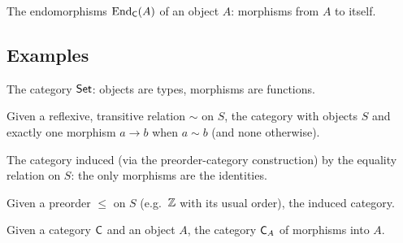 \begin{definition}[Endomorphism]
  \label{def:prelims:category-end}
  \leanok
  The endomorphisms $\operatorname{End}_{\mathsf{C}}(A)$ of an object $A$: morphisms
  from $A$ to itself.
\end{definition}

\subsection{Examples}
\label{subsec:prelims:examples}

\begin{definition}
  \label{def:prelims:type-category}
  \leanok
  The category $\mathsf{Set}$: objects are types, morphisms are
  functions.
\end{definition}

\begin{definition}
  \label{def:prelims:preorder-category}
  \leanok
  Given a reflexive, transitive relation $\sim$ on $S$, the category
  with objects $S$ and exactly one morphism $a \to b$ when $a \sim b$
  (and none otherwise).
\end{definition}

\begin{definition}
  \label{def:prelims:discrete-category}
  \leanok
  The category induced (via the preorder-category construction) by
  the equality relation on $S$: the only morphisms are the
  identities.
\end{definition}

\begin{definition}
  \label{def:prelims:le-category}
  \leanok
  Given a preorder $\leq$ on $S$ (e.g.\ $\mathbb{Z}$ with its usual order),
  the induced category.
\end{definition}

\begin{definition}
  \label{def:prelims:slice-category}
  \leanok
  Given a category $\mathsf{C}$ and an object $A$, the category
  $\mathsf{C}_A$ of morphisms into $A$.
\end{definition}

